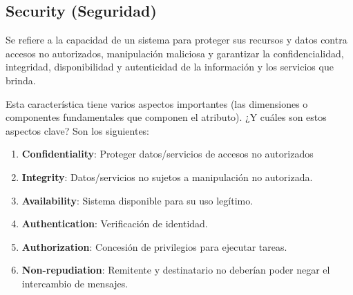 \documentclass{article}
\begin{document}
		
		\subsection{Security \small{(Seguridad)}}
		Se refiere a la capacidad de un sistema para proteger sus recursos y datos contra accesos no autorizados, manipulación maliciosa y garantizar la confidencialidad, integridad, disponibilidad y autenticidad de la información y los servicios que brinda.
		
		Esta característica tiene varios aspectos importantes (las dimensiones o componentes fundamentales que componen el atributo). ¿Y cuáles son estos aspectos clave? Son los siguientes:
			\begin{enumerate}
			\item \textbf{Confidentiality}: Proteger datos/servicios de accesos
			no autorizados
			
			\item \textbf{Integrity}: Datos/servicios no sujetos a manipulación no autorizada.
			
			\item \textbf{Availability}: Sistema disponible para su uso legítimo.
			
			\item \textbf{Authentication}: Verificación de identidad.
			
			\item \textbf{Authorization}: Concesión de privilegios para ejecutar tareas.
			
			\item \textbf{Non-repudiation}: Remitente y destinatario no deberían poder negar el intercambio de mensajes.
			
		\end{enumerate}	
\end{document}
